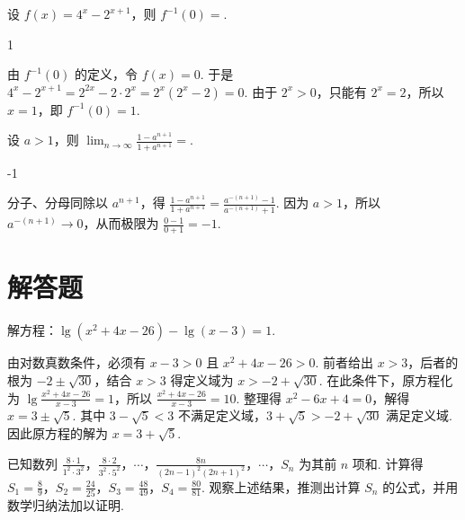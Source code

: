 \begin{problem}
设 \(f(x) = 4^{x} - 2^{x + 1}\)，则 \(f^{-1}(0) =\)\fillinblank{}.
\end{problem}

\begin{answer}
1
\end{answer}

\begin{solution}
由 \(f^{-1}(0)\) 的定义，令 \(f(x)=0\). 于是 \(\displaystyle4^x-2^{x+1}=2^{2x}-2\cdot2^x=2^x(2^x-2)=0\). 由于 \(2^x>0\)，只能有 \(2^x=2\)，所以 \(x=1\)，即 \(f^{-1}(0)=1\).
\end{solution}

\begin{problem}
设 \(a > 1\)，则 \(\displaystyle\lim_{n \to \infty} \frac{1 - a^{n + 1}}{1 + a^{n + 1}} =\)\fillinblank{}.
\end{problem}

\begin{answer}
-1
\end{answer}

\begin{solution}
分子、分母同除以 \(a^{n+1}\)，得 \(\displaystyle\frac{1-a^{n+1}}{1+a^{n+1}}=\frac{a^{-(n+1)}-1}{a^{-(n+1)}+1}\). 因为 \(a>1\)，所以 \(a^{-(n+1)}\to0\)，从而极限为 \(\displaystyle\frac{0-1}{0+1}=-1\).
\end{solution}

\section{解答题}

\begin{problem}
解方程：\(\lg (x^2 + 4x - 26) - \lg (x - 3) = 1\).
\end{problem}

\begin{solution}
由对数真数条件，必须有 \(x-3>0\) 且 \(x^2+4x-26>0\). 前者给出 \(x>3\)，后者的根为 \(-2\pm\sqrt{30}\)，结合 \(x>3\) 得定义域为 \(x>-2+\sqrt{30}\). 在此条件下，原方程化为
\(\displaystyle\lg\frac{x^2+4x-26}{x-3}=1\)，所以 \(\frac{x^2+4x-26}{x-3}=10\). 整理得 \(x^2-6x+4=0\)，解得 \(x=3\pm\sqrt{5}\). 其中 \(3-\sqrt{5}<3\) 不满足定义域，\(3+\sqrt{5}>-2+\sqrt{30}\) 满足定义域. 因此原方程的解为 \(x=3+\sqrt{5}\).
\end{solution}

\begin{problem}
已知数列 \(\frac{8 \cdot 1}{1^2 \cdot 3^2}\)，\(\frac{8 \cdot 2}{3^2 \cdot 5^2}\)，\(\cdots\)，\(\frac{8n}{(2n-1)^2 (2n+1)^2}\)，\(\cdots\)，\(S_n\) 为其前 \(n\) 项和. 计算得 \(S_1 = \frac{8}{9}\)，\(S_2 = \frac{24}{25}\)，\(S_3 = \frac{48}{49}\)，\(S_4 = \frac{80}{81}\). 观察上述结果，推测出计算 \(S_n\) 的公式，并用数学归纳法加以证明.
\end{problem}

